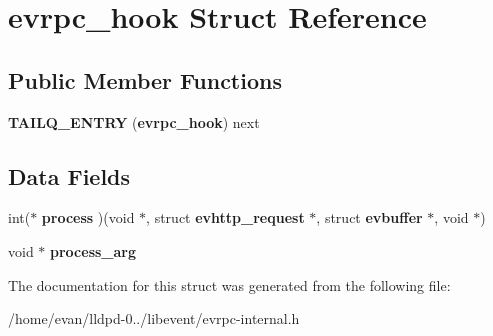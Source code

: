 \section{evrpc\-\_\-hook \-Struct \-Reference}
\label{structevrpc__hook}
\subsection*{\-Public \-Member \-Functions}
\begin{DoxyCompactItemize}
\item 
{\bfseries \-T\-A\-I\-L\-Q\-\_\-\-E\-N\-T\-R\-Y} ({\bf evrpc\-\_\-hook}) next\label{structevrpc__hook_acca0daa8bd4d061ff080d36be95d50ce}

\end{DoxyCompactItemize}
\subsection*{\-Data \-Fields}
\begin{DoxyCompactItemize}
\item 
int($\ast$ {\bfseries process} )(void $\ast$, struct {\bf evhttp\-\_\-request} $\ast$, struct {\bf evbuffer} $\ast$, void $\ast$)\label{structevrpc__hook_a22dbf968df6b2ad2d855115b7b5d941a}

\item 
void $\ast$ {\bfseries process\-\_\-arg}\label{structevrpc__hook_a4ebb2f86f2cabcbb12a164758df71117}

\end{DoxyCompactItemize}


\-The documentation for this struct was generated from the following file\-:\begin{DoxyCompactItemize}
\item 
/home/evan/lldpd-\/0../libevent/evrpc-\/internal.\-h\end{DoxyCompactItemize}
